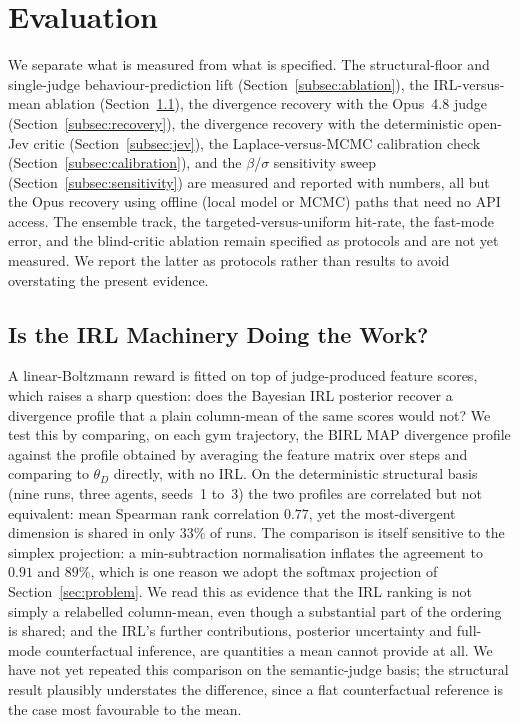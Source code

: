 \section{Evaluation}
\label{sec:evaluation}

We separate what is measured from what is specified. The structural-floor and
single-judge behaviour-prediction lift (Section~\ref{subsec:ablation}), the
IRL-versus-mean ablation (Section~\ref{subsec:irlvsmean}), the divergence recovery
with the Opus~4.8 judge (Section~\ref{subsec:recovery}), the divergence recovery with
the deterministic open-Jev critic (Section~\ref{subsec:jev}), the Laplace-versus-MCMC
calibration check (Section~\ref{subsec:calibration}), and the $\beta$/$\sigma$
sensitivity sweep (Section~\ref{subsec:sensitivity}) are measured and reported with
numbers, all but the Opus recovery using offline (local model or MCMC) paths that
need no API access. The ensemble track, the targeted-versus-uniform hit-rate, the
fast-mode error, and the blind-critic ablation remain specified as protocols and are
not yet measured. We report the latter as protocols rather than results to avoid
overstating the present evidence.

\subsection{Is the IRL Machinery Doing the Work?}
\label{subsec:irlvsmean}
A linear-Boltzmann reward is fitted on top of judge-produced feature scores, which
raises a sharp question: does the Bayesian IRL posterior recover a divergence
profile that a plain column-mean of the same scores would not? We test this by
comparing, on each gym trajectory, the BIRL MAP divergence profile against the
profile obtained by averaging the feature matrix over steps and comparing to
$\theta_D$ directly, with no IRL. On the deterministic structural basis (nine runs,
three agents, seeds~1 to~3) the two profiles are correlated but not equivalent: mean
Spearman rank correlation $0.77$, yet the most-divergent dimension is shared in only
$33\%$ of runs. The comparison is itself sensitive to the simplex projection: a
min-subtraction normalisation inflates the agreement to $0.91$ and $89\%$, which is
one reason we adopt the softmax projection of Section~\ref{sec:problem}. We read this
as evidence that the IRL ranking is not simply a relabelled column-mean, even though
a substantial part of the ordering is shared; and the IRL's further contributions,
posterior uncertainty and full-mode counterfactual inference, are quantities a mean
cannot provide at all. We have not yet repeated this comparison on the semantic-judge
basis; the structural result plausibly understates the difference, since a flat
counterfactual reference is the case most favourable to the mean.

